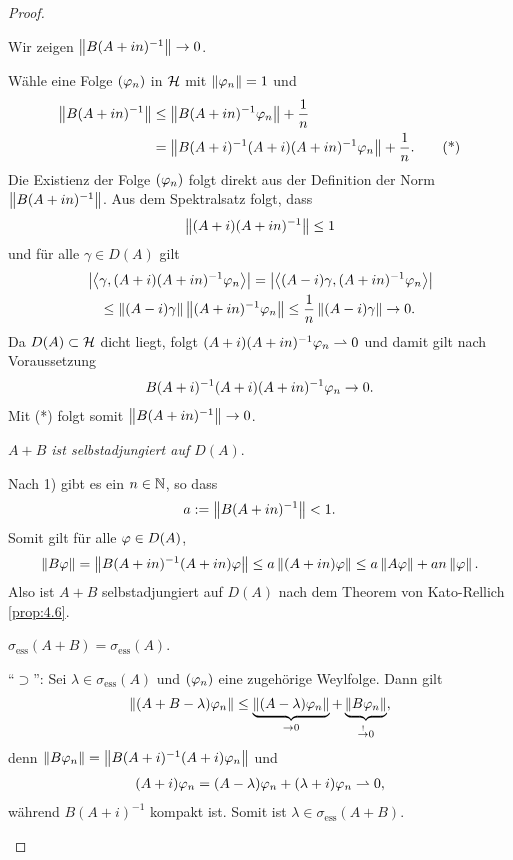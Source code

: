 \begin{proof}
\begin{proofenum}
\item Wir zeigen $\left\|B(A+in)^{-1}\right\| \to 0$.

Wähle eine Folge $(\varphi_n)$ in $\mathcal{H}$ mit $\left\|\varphi_n\right\| = 1$ und
\begin{align*}
\left\|B(A+in)^{-1}\right\| &\le \left\|B(A+in)^{-1}\varphi_n\right\| + \frac{1}{n}\\
&= \left\|B(A+i)^{-1}(A+i)(A+in)^{-1}\varphi_n\right\| + \frac{1}{n}.\tag{*}
\end{align*}
Die Existienz der Folge $(\varphi_n)$ folgt direkt aus der Definition der Norm
$\left\|B(A+in)^{-1}\right\|$. Aus dem Spektralsatz folgt, dass
\begin{align*}
\left\|(A+i)(A+in)^{-1}\right\| \le 1
\end{align*}
und für alle $\gamma\in D(A)$ gilt
\begin{align*}
&\left|\left\langle\gamma, (A+i)(A+in)^{-1}\varphi_n\right\rangle\right|
= \left|\left\langle(A-i)\gamma,(A+in)^{-1}\varphi_n\right\rangle\right|\\
&\quad \le \left\|(A-i)\gamma\right\|\left\|(A+in)^{-1}\varphi_n\right\|
\le \frac{1}{n}\left\|(A-i)\gamma\right\|\to 0.
\end{align*}
Da $D(A)\subset\mathcal{H}$ dicht liegt, folgt $(A+i)(A+in)^{-1}\varphi_n\rightharpoonup 0$ und damit
gilt nach Voraussetzung
\begin{align*}
B(A+i)^{-1}(A+i)(A+in)^{-1}\varphi_n \to 0.
\end{align*}
Mit (*) folgt somit $\left\|B(A+in)^{-1}\right\| \to 0$.
\item \textit{$A+B$ ist selbstadjungiert auf $D(A)$}.

Nach 1) gibt es ein $n\in\mathbb{N}$, so dass
\begin{align*}
a := \left\|B(A+in)^{-1}\right\| < 1.
\end{align*}
Somit gilt für alle $\varphi\in D(A)$,
\begin{align*}
\left\|B\varphi\right\| = \left\|B(A+in)^{-1}(A+in)\varphi\right\| \le a\left\|(A+in)\varphi\right\|
\le a \left\|A\varphi\right\| + an\left\|\varphi\right\|.
\end{align*}
Also ist $A+B$ selbstadjungiert auf $D(A)$ nach dem Theorem von Kato-Rellich 
\ref{prop:4.6}.

\item $\sigma_\mathrm{ess}(A+B) = \sigma_\mathrm{ess}(A)$.

``$\supset$'': Sei $\lambda\in\sigma_\mathrm{ess}(A)$ und $(\varphi_n)$ eine
zugehörige Weylfolge. Dann gilt
\begin{align*}
\left\|(A+B-\lambda)\varphi_n\right\| \le \underbrace{\left\|(A-\lambda)\varphi_n\right\|}_{\to 0} +
\underbrace{\left\|B\varphi_n\right\|}_{\overset{!}{\to}0},
\end{align*}
denn $\left\|B\varphi_n\right\| = \left\|B(A+i)^{-1}(A+i)\varphi_n\right\|$ und
\begin{align*}
(A+i)\varphi_n = (A-\lambda)\varphi_n + (\lambda+i)\varphi_n \rightharpoonup 0,
\end{align*}
während $B(A+i)^{-1}$ kompakt ist. Somit ist $\lambda\in
\sigma_\mathrm{ess}(A+B)$.


\end{proofenum}
\end{proof}
